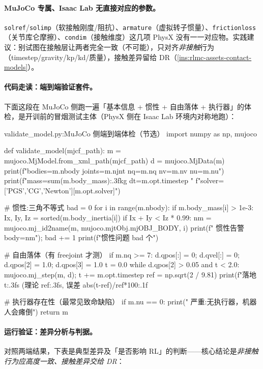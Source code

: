 \paragraph{MuJoCo 专属、Isaac Lab 无直接对应的参数。}\texttt{solref}/\allowbreak\texttt{solimp}（软接触刚度/阻抗）、\texttt{armature}（虚拟转子惯量）、\texttt{frictionloss}（关节库仑摩擦）、\texttt{condim}（接触维度）这几项 PhysX 没有一一对应物。实践建议：别试图在接触层让两者完全一致（不可能），只对齐\emph{非接触}行为（timestep/gravity/kp/kd/质量），接触差异留给 DR（\cref{ins:rlmc-assets-contact-models}）。

\paragraph{代码走读：端到端验证套件。}下面这段在 MuJoCo 侧跑一遍「基本信息 + 惯性 + 自由落体 + 执行器」的体检，是开训前的冒烟测试主体（PhysX 侧在 Isaac Lab 环境内对称地跑）：

\begin{codebox}[Python]{validate\_model.py:MuJoCo 侧端到端体检（节选）}
import numpy as np, mujoco

def validate_model(mjcf_path):
    m = mujoco.MjModel.from_xml_path(mjcf_path)
    d = mujoco.MjData(m)
    print(f"bodies={m.nbody} joints={m.njnt} nq={m.nq} nv={m.nv} nu={m.nu}")
    print(f"mass={sum(m.body_mass):.3f}kg dt={m.opt.timestep} "
          f"solver={['PGS','CG','Newton'][m.opt.solver]}")

    # 惯性:三角不等式
    bad = 0
    for i in range(m.nbody):
        if m.body_mass[i] > 1e-3:
            Ix, Iy, Iz = sorted(m.body_inertia[i])
            if Ix + Iy < Iz * 0.99:
                nm = mujoco.mj_id2name(m, mujoco.mjtObj.mjOBJ_BODY, i)
                print(f"  惯性告警 body={nm}"); bad += 1
    print(f"惯性问题 {bad} 个")

    # 自由落体（有 freejoint 才测）
    if m.nq >= 7:
        d.qpos[:] = 0; d.qvel[:] = 0; d.qpos[2] = 1.0; d.qpos[3] = 1.0
        t = 0.0
        while d.qpos[2] > 0.05 and t < 2.0:
            mujoco.mj_step(m, d); t += m.opt.timestep
        ref = np.sqrt(2 / 9.81)
        print(f"落地 {t:.3f}s (理论 {ref:.3f}s, 误差 {abs(t-ref)/ref*100:.1f}%

    # 执行器存在性（最常见致命缺陷）
    if m.nu == 0:
        print("  严重:无执行器，机器人会瘫倒")
    return m
\end{codebox}

\paragraph{运行验证：差异分析与判据。}对照两端结果，下表是典型差异及「是否影响 RL」的判断——核心结论是\emph{非接触行为应高度一致、接触差异交给 DR}：

